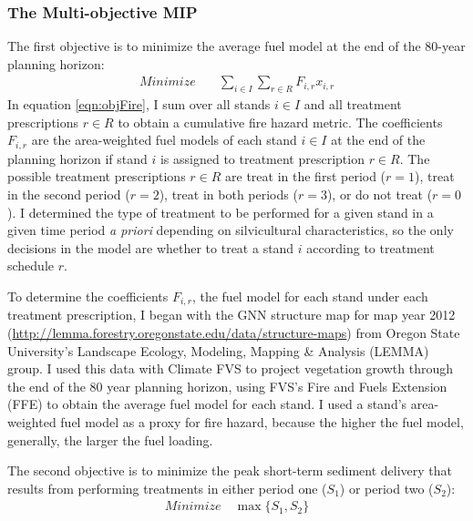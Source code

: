 \subsubsection{The Multi-objective MIP}
\label{sec:multiObjModel}
The first objective is to minimize the average fuel model at the end of the 80-year planning horizon:
\begin{align}
Minimize \quad & \sum_{i\in I} \sum_{r\in R} F_{i,r} x_{i,r} \label{eqn:objFire}
\end{align}
In equation \eqref{eqn:objFire}, I sum over all stands $i \in I$ and all treatment prescriptions $r \in R$ to obtain a cumulative fire hazard metric. The coefficients $F_{i,r}$ are the area-weighted fuel models of each stand $i \in I$ at the end of the planning horizon if stand $i$ is assigned to treatment prescription $r \in R$. The possible treatment prescriptions $r \in R$ are treat in the first period ($r=1$), treat in the second period ($r=2$), treat in both periods ($r=3$), or do not treat ($r=0$). I determined the type of treatment to be performed for a given stand in a given time period \textit{a priori} depending on silvicultural characteristics, so the only decisions in the model are whether to treat a stand $i$ according to treatment schedule $r$.

To determine the coefficients $F_{i,r}$, the fuel model for each stand under each treatment prescription, I began with the GNN structure map for map year 2012 (\url{http://lemma.forestry.oregonstate.edu/data/structure-maps}) from Oregon State University's Landscape Ecology, Modeling, Mapping \& Analysis (LEMMA) group. I used this data with Climate FVS to project vegetation growth through the end of the 80 year planning horizon, using FVS's Fire and Fuels Extension (FFE) to obtain the average fuel model for each stand. I used a stand's area-weighted fuel model as a proxy for fire hazard, because the higher the fuel model, generally, the larger the fuel loading.

The second objective is to minimize the peak short-term sediment delivery that results from performing treatments in either period one ($S_1$) or period two ($S_2$):
\begin{align}
Minimize \quad \max \{S_1,S_2\} \label{eqn:objSediment}
\end{align}

